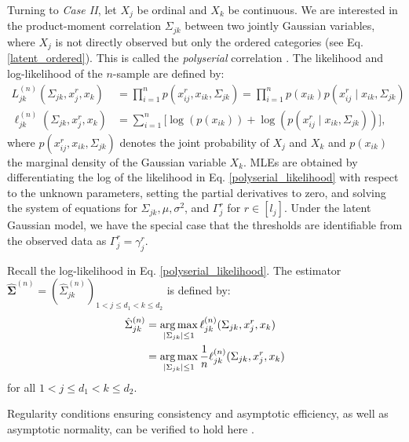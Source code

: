 Turning to \textit{Case II}, let $X_j$ be ordinal and $X_k$ be continuous. We are interested in the product-moment correlation $\Sigma_{jk}$ between two jointly Gaussian variables, where $X_j$ is not directly observed but only the ordered categories (see Eq. \eqref{latent_ordered}). This is called the \textit{polyserial} correlation \citep{Olsson82}. The likelihood and log-likelihood of the $n$-sample are defined by:
\begin{equation}\label{polyserial_likelihood}
    \begin{split}
        L_{jk}^{(n)}(\Sigma_{jk}, x_j^r,x_k) &= \prod_{i=1}^n p(x^r_{ij},x_{ik}, \Sigma_{jk}) = \prod_{i=1}^n p(x_{ik})p(x^r_{ij} \mid x_{ik}, \Sigma_{jk}) \\
        \ell_{jk}^{(n)}(\Sigma_{jk}, x^r_j,x_k) &= \sum_{i=1}^n \big[\log(p(x_{ik})) + \log(p(x^r_{ij} \mid x_{ik}, \Sigma_{jk}))\big],
    \end{split}
\end{equation}
where $p(x_{ij}^{r},x_{ik}, \Sigma_{jk})$ denotes the joint probability of  $X_j$ and $X_k$ and $p(x_{ik})$ the marginal density of the Gaussian variable $X_k$. MLEs are obtained by differentiating the log of the likelihood in Eq. \eqref{polyserial_likelihood} with respect to the unknown parameters, setting the partial derivatives to zero, and solving the system of equations for $\Sigma_{jk}, \mu, \sigma^2$, and $\Gamma_j^r$ for $r \in [l_j]$. Under the latent Gaussian model, we have the special case that the thresholds are identifiable from the observed data as \(\Gamma_j^r = \gamma_j^r\).

\begin{definition}\label{definition_case2}
    Recall the log-likelihood in Eq. \eqref{polyserial_likelihood}. The estimator $\hat{\mathbf{\Sigma}}^{(n)} = (\hat{\Sigma}_{jk}^{(n)})_{1 < j \leq d_1 < k \leq d_2}$ is defined by:
    \begin{equation}
        \begin{split}
            \hat{\Sigma}_{jk}^{(n)} &= \argmax_{\Abs{\Sigma_{jk}} \leq 1} \ell_{jk}^{(n)}(\Sigma_{jk}, x^r_j,x_k) \\
            &= \argmax_{\Abs{\Sigma_{jk}} \leq 1} \frac{1}{n} \ell_{jk}^{(n)}(\Sigma_{jk}, x^r_j,x_k)
        \end{split}
    \end{equation}
    for all $1 < j \leq d_1 < k \leq d_2$.
\end{definition}
\noindent Regularity conditions ensuring consistency and asymptotic efficiency, as well as asymptotic normality, can be verified to hold here \citep{Cox74}.


